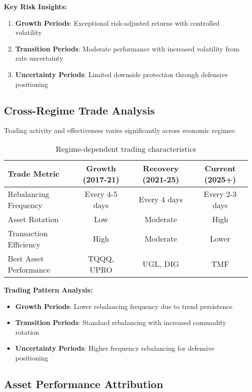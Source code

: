 \documentclass[onecolumn,11pt]{IEEEtran}
\begin{document}
\textbf{Key Risk Insights:}
\begin{enumerate}
    \item \textbf{Growth Periods}: Exceptional risk-adjusted returns with controlled volatility
    \item \textbf{Transition Periods}: Moderate performance with increased volatility from rate uncertainty
    \item \textbf{Uncertainty Periods}: Limited downside protection through defensive positioning
\end{enumerate}

\subsection{Cross-Regime Trade Analysis}

Trading activity and effectiveness varies significantly across economic regimes:

\begin{table}[h]
\centering
\begin{tabular}{lccc}
\toprule
\textbf{Trade Metric} & \textbf{Growth (2017-21)} & \textbf{Recovery (2021-25)} & \textbf{Current (2025+)} \\
\midrule
Rebalancing Frequency & Every 4-5 days & Every 4 days & Every 2-3 days \\
Asset Rotation & Low & Moderate & High \\
Transaction Efficiency & High & Moderate & Lower \\
Best Asset Performance & TQQQ, UPRO & UGL, DIG & TMF \\
\bottomrule
\end{tabular}
\caption{Regime-dependent trading characteristics}
\end{table}

\textbf{Trading Pattern Analysis:}
\begin{itemize}
    \item \textbf{Growth Periods}: Lower rebalancing frequency due to trend persistence
    \item \textbf{Transition Periods}: Standard rebalancing with increased commodity rotation
    \item \textbf{Uncertainty Periods}: Higher frequency rebalancing for defensive positioning
\end{itemize}

\subsection{Asset Performance Attribution}
\end{document}
